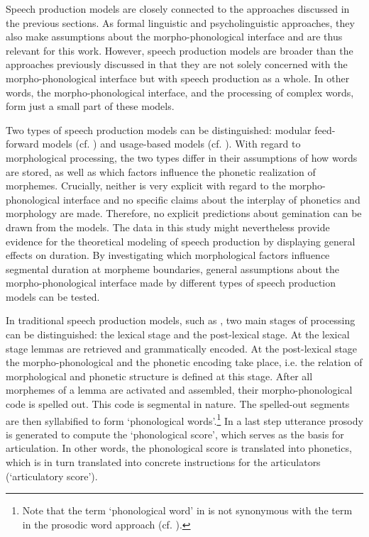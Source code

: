 {Speech production models are closely connected to the approaches discussed in the previous sections. As formal linguistic and psycholinguistic approaches, they also make assumptions about the morpho-phonological interface and are thus relevant for this work. However, speech production models are broader than the approaches previously discussed in that they are not solely concerned with the morpho-phonological interface but with speech production as a whole. In other words, the morpho-phonological interface, and the processing of complex words, form just a small part of these models.

 Two types of  speech production models can be distinguished: modular feed-forward models (cf. \citealt{Levelt.1999,Levelt.1999b,Levelt.2000}) and usage-based models (cf. \citealt{Johnson.1997b,Bybee.2002,Pierrehumbert.2001,Pierrehumbert.2002}). With regard to morphological processing, the two types differ in their assumptions of how words are stored, as well as which factors influence the phonetic realization of morphemes. Crucially, neither is very explicit with regard to the morpho-phonological interface and no specific claims about the interplay of phonetics and morphology are made. Therefore, no explicit predictions about gemination can be drawn from the models. The data in this study might nevertheless provide evidence for the theoretical modeling of  speech production by displaying general effects on duration. By investigating which morphological factors influence segmental duration at morpheme boundaries, general assumptions about the morpho-phonological interface made by different types of speech production models can be tested.

In traditional speech production models, such as  \cite{Levelt.1999b}, two main stages of processing can be distinguished: the lexical stage and the post-lexical stage. At the lexical stage lemmas are retrieved and grammatically encoded. At the post-lexical stage the morpho-phonological and the phonetic encoding take place, i.e. the relation of morphological and phonetic structure is defined at this stage. After all morphemes of a lemma are activated and assembled, their morpho-phonological code is spelled out. This code is segmental in nature. The spelled-out segments are then syllabified to form `phonological words'.\footnote{Note that the term `phonological word' in \cite{Levelt.1999b} is not synonymous with the term in the prosodic word approach (cf. ). } In a last step utterance prosody is generated to compute the `phonological score', which serves as the basis for articulation. In other words, the phonological score is translated into phonetics, which is in turn translated into concrete instructions for the articulators (`articulatory score').

}
